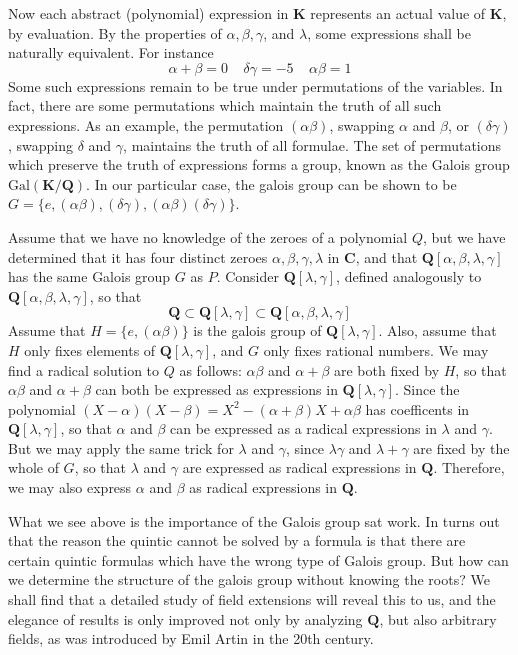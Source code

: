 Now each abstract (polynomial) expression in $\mathbf{K}$ represents an actual value of $\mathbf{K}$, by evaluation. By the properties of $\alpha, \beta, \gamma$, and $\lambda$, some expressions shall be naturally equivalent. For instance
%
\[ \alpha + \beta = 0\ \ \ \ \ \delta \gamma = -5\ \ \ \ \ \alpha \beta = 1 \]
%
Some such expressions remain to be true under permutations of the variables. In fact, there are some permutations which maintain the truth of all such expressions. As an example, the permutation $(\alpha \beta)$, swapping $\alpha$ and $\beta$, or $(\delta \gamma)$, swapping $\delta$ and $\gamma$, maintains the truth of all formulae. The set of permutations which preserve the truth of expressions forms a group, known as the Galois group $\text{Gal}(\mathbf{K} / \mathbf{Q})$. In our particular case, the galois group can be shown to be $G = \{ e, (\alpha \beta), (\delta \gamma), (\alpha \beta) (\delta \gamma) \}$.

Assume that we have no knowledge of the zeroes of a polynomial $Q$, but we have determined that it has four distinct zeroes $\alpha, \beta, \gamma, \lambda$ in $\mathbf{C}$, and that $\mathbf{Q}[\alpha, \beta, \lambda, \gamma]$ has the same Galois group $G$ as $P$. Consider $\mathbf{Q}[\lambda, \gamma]$, defined analogously to $\mathbf{Q}[\alpha, \beta, \lambda, \gamma]$, so that
%
\[ \mathbf{Q} \subset \mathbf{Q}[\lambda, \gamma] \subset \mathbf{Q}[\alpha, \beta, \lambda, \gamma] \]
%
Assume that $H = \{ e, (\alpha \beta) \}$ is the galois group of $\mathbf{Q}[\lambda, \gamma]$. Also, assume that $H$ only fixes elements of $\mathbf{Q}[\lambda, \gamma]$, and $G$ only fixes rational numbers. We may find a radical solution to $Q$ as follows: $\alpha \beta$ and $\alpha + \beta$ are both fixed by $H$, so that $\alpha \beta$ and $\alpha + \beta$ can both be expressed as expressions in $\mathbf{Q}[\lambda, \gamma]$. Since the polynomial $(X - \alpha)(X - \beta) = X^2 - (\alpha + \beta) X + \alpha \beta$ has coefficents in $\mathbf{Q}[\lambda, \gamma]$, so that $\alpha$ and $\beta$ can be expressed as a radical expressions in $\lambda$ and $\gamma$. But we may apply the same trick for $\lambda$ and $\gamma$, since $\lambda \gamma$ and $\lambda + \gamma$ are fixed by the whole of $G$, so that $\lambda$ and $\gamma$ are expressed as radical expressions in $\mathbf{Q}$. Therefore, we may also express $\alpha$ and $\beta$ as radical expressions in $\mathbf{Q}$.

What we see above is the importance of the Galois group sat work. In turns out that the reason the quintic cannot be solved by a formula is that there are certain quintic formulas which have the wrong type of Galois group. But how can we determine the structure of the galois group without knowing the roots? We shall find that a detailed study of field extensions will reveal this to us, and the elegance of results is only improved not only by analyzing $\mathbf{Q}$, but also arbitrary fields, as was introduced by Emil Artin in the 20th century.

